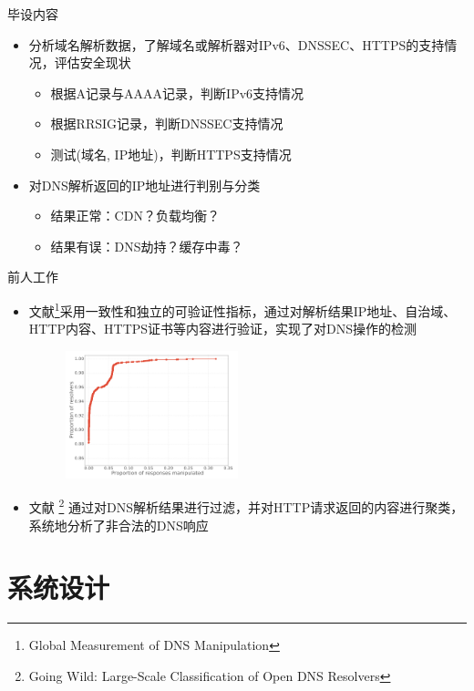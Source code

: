 \documentclass{beamer}
\begin{document}
\begin{frame}{毕设内容}
  \begin{itemize}
    \item 分析域名解析数据，了解域名或解析器对IPv6、DNSSEC、HTTPS的支持情况，评估安全现状
    \begin{itemize}
      \item 根据A记录与AAAA记录，判断IPv6支持情况  
      \item 根据RRSIG记录，判断DNSSEC支持情况
      \item 测试(域名, IP地址)，判断HTTPS支持情况
    \end{itemize}
    \item 对DNS解析返回的IP地址进行判别与分类
    \begin{itemize}
      \item 结果正常：CDN？负载均衡？
      \item 结果有误：DNS劫持？缓存中毒？
    \end{itemize}
  \end{itemize}
\end{frame}


\begin{frame}{前人工作}
  \begin{itemize}
    \item 文献\cite{Pearce2017}\footnote[1]{Global Measurement of DNS Manipulation}采用一致性和独立的可验证性指标，通过对解析结果IP地址、自治域、HTTP内容、HTTPS证书等内容进行验证，实现了对DNS操作的检测
    \begin{figure}
      \includegraphics[width=5cm]{images/dnsmanipulate.png}
      \end{figure}
    \item 文献 \cite{Kuhrer}\footnote[7]{Going Wild: Large-Scale Classification of Open DNS Resolvers} 通过对DNS解析结果进行过滤，并对HTTP请求返回的内容进行聚类，系统地分析了非合法的DNS响应
  \end{itemize}
\end{frame}

\section{系统设计}
\end{document}
